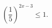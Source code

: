 \begin{ex}[type=inequality]
	\begin{condition}
		$\left(\dfrac{1}{5}\right)^{2x - 3}\leqslant1  .$
	\end{condition}
\end{ex}